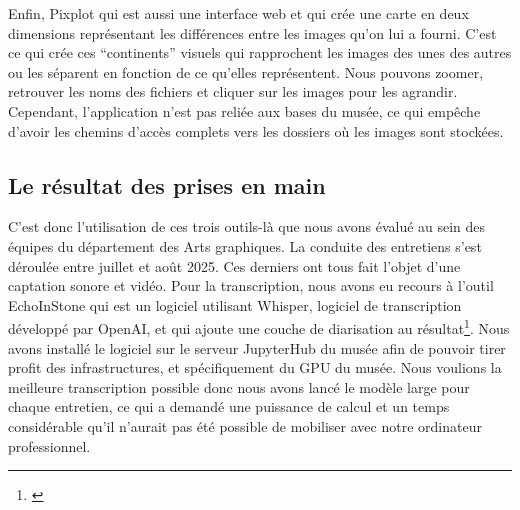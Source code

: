 Enfin, Pixplot qui est aussi une interface web et qui crée une carte en deux dimensions représentant les différences entre les images qu'on lui a fourni. C'est ce qui crée ces \enquote{continents} visuels qui rapprochent les images des unes des autres ou les séparent en fonction de ce qu'elles représentent. Nous pouvons zoomer, retrouver les noms des fichiers et cliquer sur les images pour les agrandir. Cependant, l'application n'est pas reliée aux bases du musée, ce qui empêche d'avoir les chemins d'accès complets vers les dossiers où les images sont stockées.

\subsection{Le résultat des prises en main}

C'est donc l'utilisation de ces trois outils-là que nous avons évalué au sein des équipes du département des Arts graphiques. La conduite des entretiens s'est déroulée entre juillet et août 2025. Ces derniers ont tous fait l'objet d'une captation sonore et vidéo. Pour la transcription, nous avons eu recours à l'outil EchoInStone qui est un logiciel utilisant Whisper, logiciel de transcription développé par OpenAI, et qui ajoute une couche de diarisation au résultat\footnote{\cite{levy_jeanjeromeechoinstone_2025}}. Nous avons installé le logiciel sur le serveur JupyterHub du musée afin de pouvoir tirer profit des infrastructures, et spécifiquement du GPU du musée. Nous voulions la meilleure transcription possible donc nous avons lancé le modèle large pour chaque entretien, ce qui a demandé une puissance de calcul et un temps considérable qu'il n'aurait pas été possible de mobiliser avec notre ordinateur professionnel. 


